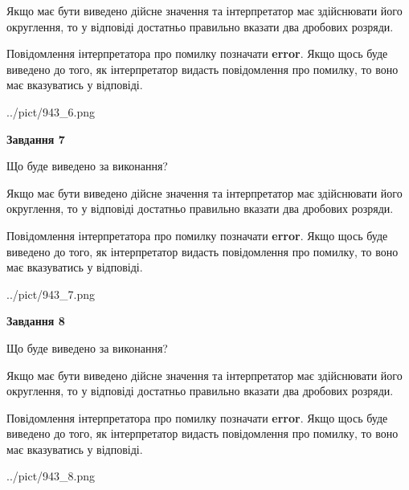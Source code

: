 \documentclass[12pt, ukrainian]{article}
\begin{document}
{\begin {Large}
Якщо має бути виведено дійсне значення та інтерпретатор має здійснювати його округлення, 
то у відповіді достатньо правильно вказати два дробових розряди.

Повідомлення інтерпретатора про помилку позначати \textbf{error}.
Якщо щось буде виведено до того, як інтерпретатор видасть повідомлення про помилку, 
то воно має вказуватись у відповіді. \par

\begin{center}
	{../pict/943_6.png}
\end{center}
\newpage

{\begin {center}\textbf{Завдання 7}\end {center}}\par
Що буде виведено за виконання? \par

Якщо має бути виведено дійсне значення та інтерпретатор має здійснювати його округлення, 
то у відповіді достатньо правильно вказати два дробових розряди.

Повідомлення інтерпретатора про помилку позначати \textbf{error}.
Якщо щось буде виведено до того, як інтерпретатор видасть повідомлення про помилку, 
то воно має вказуватись у відповіді. \par

\begin{center}
	{../pict/943_7.png}
\end{center}
\newpage

{\begin {center}\textbf{Завдання 8}\end {center}}\par
Що буде виведено за виконання? \par

Якщо має бути виведено дійсне значення та інтерпретатор має здійснювати його округлення, 
то у відповіді достатньо правильно вказати два дробових розряди.

Повідомлення інтерпретатора про помилку позначати \textbf{error}.
Якщо щось буде виведено до того, як інтерпретатор видасть повідомлення про помилку, 
то воно має вказуватись у відповіді. \par

\begin{center}
	{../pict/943_8.png}
\end{center}
\newpage


\end{Large}}
\end{document}
